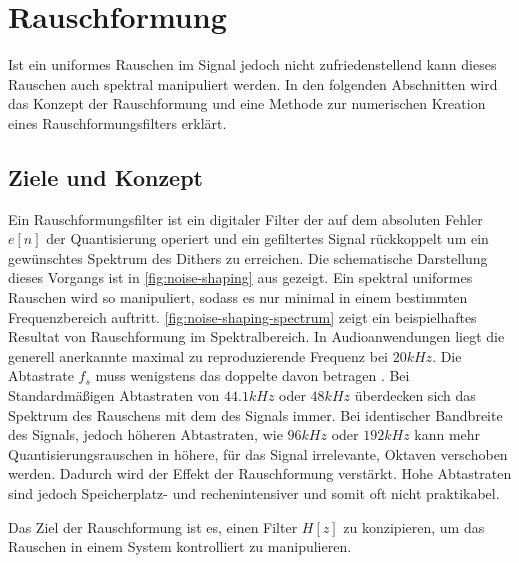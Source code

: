 \section{Rauschformung}

Ist ein uniformes Rauschen im Signal jedoch nicht zufriedenstellend kann dieses Rauschen auch spektral manipuliert werden.
In den folgenden Abschnitten wird das Konzept der Rauschformung und eine Methode zur numerischen Kreation eines Rauschformungsfilters erklärt.

\subsection{Ziele und Konzept}

Ein Rauschformungsfilter ist ein digitaler Filter der auf dem absoluten Fehler $e[n]$ der Quantisierung operiert und ein gefiltertes Signal rückkoppelt um ein gewünschtes Spektrum des Dithers zu erreichen.
Die schematische Darstellung dieses Vorgangs ist in \autoref{fig:noise-shaping} aus \autocite{noise-shaping} gezeigt.
Ein spektral uniformes Rauschen wird so manipuliert, sodass es nur minimal in einem bestimmten Frequenzbereich auftritt.
\autoref{fig:noise-shaping-spectrum} zeigt ein beispielhaftes Resultat von Rauschformung im Spektralbereich.
In Audioanwendungen liegt die generell anerkannte maximal zu reproduzierende Frequenz bei $20\si{kHz}$.
Die Abtastrate $f_s$ muss wenigstens das doppelte davon betragen \autocite{shannon}.
Bei Standardmäßigen Abtastraten von $44.1\si{kHz}$ oder $48\si{kHz}$ überdecken sich das Spektrum des Rauschens mit dem des Signals immer.
Bei identischer Bandbreite des Signals, jedoch höheren Abtastraten, wie $96\si{kHz}$ oder $192\si{kHz}$ kann mehr Quantisierungsrauschen in höhere, für das Signal irrelevante, Oktaven verschoben werden.
Dadurch wird der Effekt der Rauschformung verstärkt.
Hohe Abtastraten sind jedoch Speicherplatz- und rechenintensiver und somit oft nicht praktikabel.

Das Ziel der Rauschformung ist es, einen Filter $H[z]$ zu konzipieren, um das Rauschen in einem System kontrolliert zu manipulieren.

